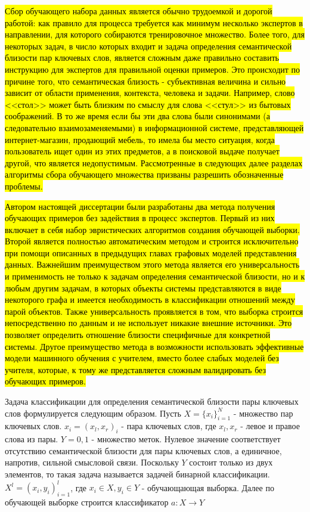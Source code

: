 \hl{Сбор обучающего набора данных является обычно трудоемкой и дорогой работой: как правило для процесса требуется как минимум несколько экспертов в направлении, для которого собираются тренировочное множество. Более того, для некоторых задач, в число которых входит и задача определения семантической близости пар ключевых слов, является сложным даже правильно составить инструкцию для экспертов для правильной оценки примеров. Это происходит по причине того, что семантическая близость - субъективная величина и сильно зависит от области применения, контекста, человека и задачи. Например, слово <<стол>> может быть близким по смыслу для слова <<стул>> из бытовых соображений. В то же время если бы эти два слова были синонимами (а следовательно взаимозаменяемыми) в информационной системе, представляющей интернет-магазин, продающий мебель, то имела бы место ситуация, когда пользователь ищет один из этих предметов, а в поисковой выдаче получает другой, что является недопустимым. Рассмотренные в следующих далее разделах алгоритмы сбора обучающего множества призваны разрешить обозначенные проблемы.}

\hl{Автором настоящей диссертации были разработаны два метода получения обучающих примеров без задействия в процесс экспертов. Первый из них включает в себя набор эвристических алгоритмов создания обучающей выборки. Второй является полностью автоматическим методом и строится исключительно при помощи описанных в предыдущих главах графовых моделей представления данных. Важнейшим преимуществом этого метода является его универсальность и применимость не только к задачам определения семантической близости, но и к любым другим задачам, в которых объекты системы представляются в виде некоторого графа и имеется необходимость в классификации отношений между парой объектов. Также универсальность проявляется в том, что выборка строится непосредственно по данным и не использует никакие внешние источники. Это позволяет определить отношение близости специфичные для конкретной системы. Другое преимущество метода в возможности использовать эффективные модели машинного обучения с учителем, вместо более слабых моделей без учителя, которые, к тому же представляется сложным валидировать без обучающих примеров.}

Задача классификации для определения семантической близости пары ключевых слов формулируется следующим образом. Пусть $X=\{x_i\}_{i=1}^N$ - множество пар ключевых слов. $x_i=(x_l,x_r)_i$ - пара ключевых слов, где $x_l,x_r$ - левое и правое слова из пары. $Y={0,1}$ - множество меток. Нулевое значение соответствует отсутствию семантической близости для пары ключевых слов, а единичное, напротив, сильной смысловой связи. Поскольку $Y$ состоит только из двух элементов, то такая задача называется задачей бинарной классификации. $X^l=(x_i,y_i)_{i=1}^l$, где $x_i \in X, y_i \in Y$ - обучающающая выборка. Далее по обучающей выборке строится классификатор $a: X\rightarrow Y$

